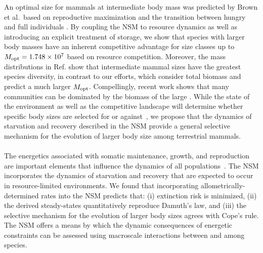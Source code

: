 \documentclass[twocolumn,preprintnumbers,amsmath,amssymb,superscriptaddress]{revtex4}
\begin{document}
An optimal size for mammals at intermediate body mass was predicted by Brown et al.\ based on reproductive maximization and the transition between hungry and full individuals \cite{Brown:1993p708}. 
By coupling the NSM to resource dynamics as well as introducing an explicit treatment of storage, we show that species with larger body masses have an inherent competitive advantage for size classes up to $M_{\rm opt}= 1.748\times10^7$ based on resource competition. Moreover, the mass distributions in Ref. \cite{Brown:1993p708} show that intermediate mammal sizes have the greatest species diversity, in contrast to our efforts, which consider total biomass and predict a much larger $M_{\rm opt}$.
Compellingly, recent work shows that many communities can be dominated by the biomass of the large \cite{Hempson:2015hka}.
While the state of the environment as well as the competitive landscape will determine whether specific body sizes are selected for or against~\citep{Saarinen:2014br}, we propose that the dynamics of starvation and recovery described in the NSM provide a general selective mechanism for the evolution of larger body size among terrestrial mammals.\\

 \\




The energetics associated with somatic maintenance, growth, and reproduction
are important elements that influence the dynamics of all
populations~\citep{Stearns:1989ip}.  The NSM incorporates the dynamics of
starvation and recovery that are expected to occur in resource-limited
environments.  We found that incorporating allometrically-determined rates
into the NSM predicts that: (i) extinction risk is minimized, (ii) the
derived steady-states quantitatively reproduce Damuth's law, and (iii) the
selective mechanism for the evolution of larger body sizes agrees with Cope's
rule.  The NSM offers a means by which the dynamic consequences of energetic
constraints can be assessed using macroscale interactions between and among
species.
\end{document}
